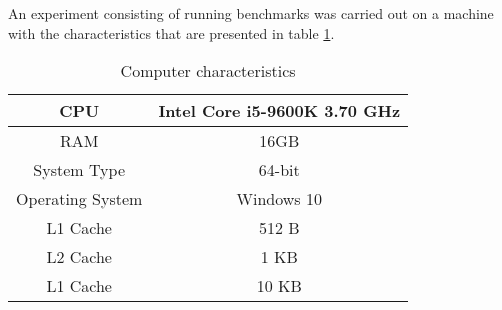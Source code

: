 An experiment consisting of running benchmarks was carried out on a machine
with the characteristics that are presented in table \ref{table:1}.
\begin{table}[ht!]
    \centering
    \begin{tabular}{|c|c|}
        \hline
        CPU & Intel Core i5-9600K 3.70 GHz\\
        \hline
        RAM & 16GB \\
        \hline
        System Type & 64-bit\\
        \hline
        Operating System & Windows 10\\
        \hline
        L1 Cache & 512 B\\
        \hline
        L2 Cache & 1 KB\\
        \hline
        L1 Cache & 10 KB\\
        \hline
    \end{tabular}
    \caption{Computer characteristics}
    \label{table:1}
\end{table}

